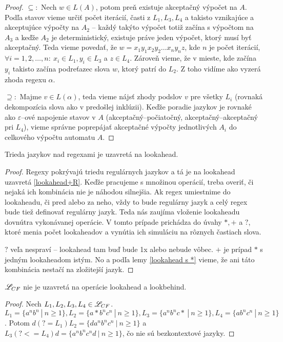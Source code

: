 \begin{proof}
$\subseteq:$ Nech $w \in L(A)$, potom preň existuje akceptačný výpočet na $A$. Podľa stavov vieme určiť počet iterácií, časti z $L_1,L_3,L_4$ a takisto vznikajúce a akceptujúce výpočty na $A_2$ -- každý takýto výpočet totiž začína s výpočtom na $A_3$ a keďže $A_2$ je de\-ter\-mi\-nis\-tic\-ký, existuje práve jeden výpočet, ktorý musí byť akceptačný. Teda vieme povedať, že $w = x_1y_1x_2y_2 \dots x_ny_nz$, kde $n$ je počet iterácií, $\forall i = 1, 2, \dots, n : ~ x_i \in L_1, y_i \in L_3 $ a $z \in L_4$. Zároveň vieme, že v mieste, kde začína $y_i$ takisto začína podreťazec slova $w$, ktorý patrí do $L_2$. Z toho vidíme ako vyzerá zhoda regexu $\alpha$.

$\supseteq:$ Majme $v \in L(\alpha)$, teda vieme nájsť zhody podslov $v$ pre všetky $L_i$ (rovnaká dekompozícia slova ako v predošlej inklúzii). Keďže poradie jazykov je rovnaké ako $\varepsilon$--ové napojenie stavov v $A$ (akceptačný--počiatočný, akceptačný--akceptačný pri $L_4$), vieme správne poprepájať akceptačné výpočty jednotlivých $A_i$ do celkového výpočtu automatu $A$.
\end{proof}

\begin{veta} \label{reg_uz_la}
Trieda jazykov nad regexami je uzavretá na lookahead.
\end{veta}
\begin{proof}
Regexy pokrývajú triedu regulárnych jazykov a tá je na lookahead uzavretá \ref{lookahead+R}. Keďže pracujeme s množinou operácií, treba overiť, či nejaká ich kombinácia nie je náhodou silnejšia. Ak regex umiestnime do lookaheadu, či pred alebo za neho, vždy to bude regulárny jazyk a celý regex bude tiež definovať regulárny jazyk. Teda nás zaujíma vloženie lookaheadu dovnútra vykonávanej operácie. V tomto prípade prichádza do úvahy $*,+$ a $?$, ktoré menia počet lookaheadov a vynútia ich simuláciu na rôznych častiach slova.

$?$ veľa nespraví -- lookahead tam buď bude 1x alebo nebude vôbec. $+$ je prípad $*$ s jedným lookaheadom istým. No a podľa lemy \ref{lookahead s *} vieme, že ani táto kombinácia nestačí na zložitejší jazyk.
\end{proof}

\begin{veta}
$ \mathscr{L}_{CF} $ nie je uzavretá na operácie lookahead a lookbehind.
\end{veta}
\begin{proof}
Nech $ L_{1}, L_{2}, L_{3}, L_4 \in \mathscr{L}_{CF} $. $ L_1 = \lbrace a^nb^n ~|~ n\geq 1 \rbrace , L_2 = \lbrace a*b^nc^n ~|~ n\geq 1\rbrace , L_3 = \lbrace a^nb^nc* ~|~ n \geq 1\rbrace, L_4 = \lbrace ab^nc^n ~|~ n \geq 1 \rbrace$. Potom $ d(?=L_1)L_2 = \lbrace da^nb^nc^n ~|~ n\geq 1 \rbrace $ a $ L_3(?<=L_4)d = \lbrace a^nb^nc^nd ~|~ n\geq 1 \rbrace$, čo nie sú bezkontextové jazyky.
\end{proof}

